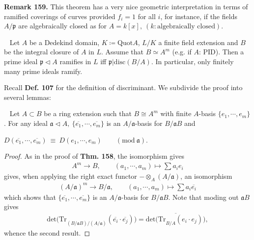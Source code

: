 \documentclass[12pt,a4paper,footinclude=true,headinclude=true]{scrbook} %
\newenvironment{theorem}[2][]
{\renewcommand\theinnercustomthm{#2}\innercustomthm[#1]
\begin{mdframed}[backgroundcolor=yellow!20]\ }
{\end{mdframed}\endinnercustomthm}
\newenvironment{lemma}[2][]
{\renewcommand\theinnercustomlemma{#2}\innercustomlemma[#1]
\begin{mdframed}[backgroundcolor=gray!20]\ }
{\end{mdframed}\endinnercustomprop}
\newenvironment{remark}[2][Remark]
    { \begin{mdframed}[backgroundcolor=gray!20] \textbf{#1 #2.} }
    {  \end{mdframed}}
\begin{document}
\begin{remark}{159}
    This theorem has a very nice geometric interpretation in terms of ramified coverings of curves provided $f_i=1$ for all $i$, for instance, if the fields $A/\mathfrak{p}$ are algebraically closed as for $A=k[x],\ (k: \text{algebraically closed})$.
\end{remark}
\newpage
\begin{theorem}{160}
    Let $A$ be a Dedekind domain, $K\coloneqq\mathrm{Quot}A$, $L/K$ a finite field extension and $B$ be the integral closure of $A$ in $L$. Assume that $B\simeq A^m$ (e.g. if $A$: PID). Then a prime ideal $\mathfrak{p}\triangleleft A$ ramifies in $L$ iff $\mathfrak{p}|\mathrm{disc}(B/A)$. In particular, only finitely many prime ideals ramify.
\end{theorem}

Recall \textbf{Def. 107} for the definition of discriminant. We subdivide the proof into several lemmas:
\begin{lemma}{161}
    Let $A\subset B$ be a ring extension such that $B\cong A^m$ with finite $A$-basis $\{e_1,\cdots,e_m\}$. For any ideal $\mathfrak{a}\triangleleft A,\ \{\overline{e_1},\cdots,\overline{e_m}\}$ is an $A/\mathfrak{a}$-basis for $B/\mathfrak{a}B$ and \\
    \centerline{$D(\overline{e_1},\cdots,\overline{e_m})\ \equiv\  D(e_1,\cdots,e_m)\qquad(\mathrm{mod}\ \mathfrak{a})$.}
\end{lemma}
\begin{proof}
    As in the proof of \textbf{Thm. 158}, the isomorphism gives
    \begin{align*}
        A^m\longrightarrow B,\qquad (a_1,\cdots,a_m)\longmapsto\sum a_ie_i
    \end{align*}
    gives, when applying the right exact functor $-\otimes_A(A/\mathfrak{a})$, an isomorphism
    \begin{align*}
        (A/\mathfrak{a})^m\longrightarrow B/\mathfrak{a},\qquad (a_1,\cdots,a_m)\longmapsto\sum a_i\overline{e_i}
    \end{align*}
    which shows that $\{\overline{e_1},\cdots,\overline{e_m}\}$ is an $A/\mathfrak{a}$-basis for $B/\mathfrak{a}B$. Note that moding out $\mathfrak{a}B$ gives
    \begin{align*}
        \mathrm{det(Tr}_{(B/\mathfrak{a}B)/(A/\mathfrak{a})}(\overline{e_i}\cdot\overline{e_j}))=\overline{\mathrm{det(Tr}_{B/A}(e_i\cdot e_j))},
    \end{align*}
    whence the second result.
\end{proof}
\end{document}
